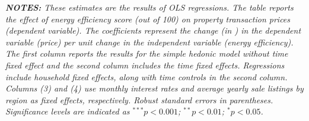 \begin{table}[ht]
{}
\begin{minipage}{\textwidth}
\scriptsize{\textit{\scriptsize{{\textbf{NOTES:} These estimates are the results of OLS regressions. The table reports the effect of energy efficiency score (out of 100) on property transaction prices (dependent variable). The coefficients represent the change (in \textsterling) in the dependent variable (price) per unit change in the independent variable (energy efficiency). The first column reports the results for the simple hedonic model without time fixed effect and the second column includes the time fixed effects. Regressions include household fixed effects, along with time controls in the second column. Columns (3) and (4) use monthly interest rates and average yearly sale listings by region as fixed effects, respectively. Robust standard errors in parentheses. Significance levels are indicated as $^{***}p<0.001$; $^{**}p<0.01$; $^{*}p<0.05$.}}}}
\end{minipage}
\label{tab:hedonic_model}
\end{table}
